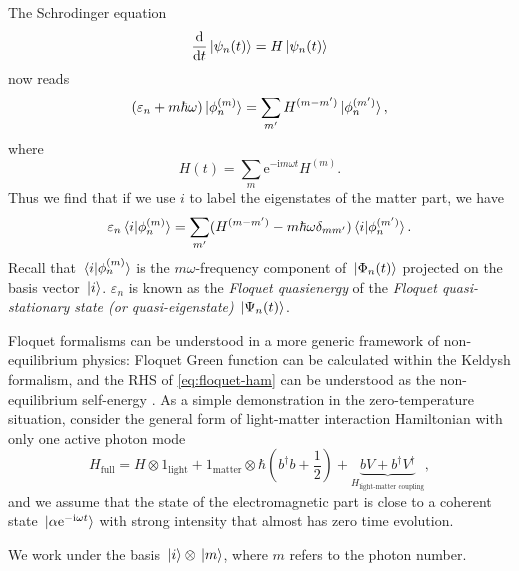 \documentclass[hyperref, a4paper]{article}
\newcommand*{\ii}{\mathrm{i}}
\newcommand*{\ee}{\mathrm{e}}
\begin{document}
The Schrodinger equation 
\begin{equation}
    \dv{t} \ket*{\psi_n(t)} = H \ket*{\psi_n(t)}
\end{equation}
now reads 
\begin{equation}
    (\varepsilon_n + m \hbar \omega) \ket*{\phi_n^{(m)}} 
    = \sum_{m'} H^{(m - m')} \ket*{\phi_n^{(m')}},
\end{equation}
where 
\begin{equation}
    H(t) = \sum_{m} \ee^{- \ii m \omega t} H^{(m)}.
\end{equation}
Thus we find that if we use $i$ to label the eigenstates of the matter part, 
we have 
\begin{equation}
    \varepsilon_n \braket*{i}{\phi^{(m)}_n}
    = \sum_{m'} (
        H^{(m - m')} - m \hbar \omega \delta_{m m'}
    ) \braket*{i}{\phi^{(m')}_{n}}.
    \label{eq:floquet-ham}
\end{equation}
Recall that $\braket*{i}{\phi_n^{(m)}}$ is the 
$m \omega$-frequency component of $\ket*{\Phi_n(t)}$
projected on the basis vector $\ket*{i}$.
$\varepsilon_n$ is known as the \emph{Floquet quasienergy} of 
the \emph{Floquet quasi-stationary state (or quasi-eigenstate)} $\ket*{\Psi_n(t)}$.

Floquet formalisms can be understood in a more generic framework of non-equilibrium physics:
Floquet Green function can be calculated within the Keldysh formalism,
and the RHS of \eqref{eq:floquet-ham} can be understood as the 
non-equilibrium self-energy \cite{lubatsch2019evolution,aoki2014nonequilibrium}.
As a simple demonstration in the zero-temperature situation, 
consider the general form of light-matter interaction Hamiltonian 
with only one active photon mode
\begin{equation}
    H_{\text{full}} = 
    H \otimes 1_{\text{light}} + 1_{\text{matter}} \otimes \hbar \left(
        b^\dagger b + \frac{1}{2} 
    \right) 
    + \underbrace{
        b V + b^\dagger V^\dagger  
    }_{H_{\text{light-matter coupling}}} ,
\end{equation}
and we assume that the state of the electromagnetic part 
is close to a coherent state $\ket*{\alpha \ee^{- \ii \omega t}}$ 
with strong intensity that almost has zero time evolution. 

We work under the basis $\ket*{i} \otimes \ket*{m}$,
where $m$ refers to the photon number. 
\end{document}
